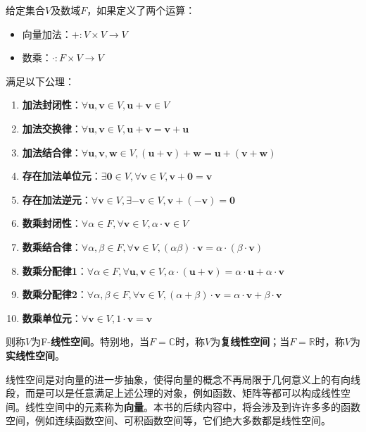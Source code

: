 \documentclass{ctexbook}
\begin{document}
\begin{definition}[线性空间]
    给定集合$V$及数域$F$，如果定义了两个运算：
    \begin{itemize}
        \item 向量加法：$+:V\times V\rightarrow V$
        \item 数乘：$\cdot :F\times V\rightarrow V$
    \end{itemize}
    满足以下公理：
    \begin{enumerate}
        \item \textbf{加法封闭性}：$\forall \mathbf{u},\mathbf{v}\in V,\mathbf{u}+\mathbf{v}\in V$
        \item \textbf{加法交换律}：$\forall \mathbf{u},\mathbf{v}\in V,\mathbf{u}+\mathbf{v}=\mathbf{v}+\mathbf{u}$
        \item \textbf{加法结合律}：$\forall \mathbf{u},\mathbf{v},\mathbf{w}\in V,(\mathbf{u}+\mathbf{v})+\mathbf{w}=\mathbf{u}+(\mathbf{v}+\mathbf{w})$
        \item \textbf{存在加法单位元}：$\exists \mathbf{0}\in V,\forall \mathbf{v}\in V,\mathbf{v}+\mathbf{0}=\mathbf{v}$
        \item \textbf{存在加法逆元}：$\forall \mathbf{v}\in V,\exists -\mathbf{v}\in V,\mathbf{v}+(-\mathbf{v})=\mathbf{0}$
        \item \textbf{数乘封闭性}：$\forall \alpha\in F,\forall \mathbf{v}\in V,\alpha\cdot\mathbf{v}\in V$
        \item \textbf{数乘结合律}：$\forall \alpha,\beta\in F,\forall \mathbf{v}\in V,(\alpha\beta)\cdot\mathbf{v}=\alpha\cdot(\beta\cdot\mathbf{v})$
        \item \textbf{数乘分配律1}：$\forall \alpha\in F,\forall \mathbf{u},\mathbf{v}\in V,\alpha\cdot(\mathbf{u}+\mathbf{v})=\alpha\cdot\mathbf{u}+\alpha\cdot\mathbf{v}$
        \item \textbf{数乘分配律2}：$\forall \alpha,\beta\in F,\forall \mathbf{v}\in V,(\alpha+\beta)\cdot\mathbf{v}=\alpha\cdot\mathbf{v}+\beta\cdot\mathbf{v}$
        \item \textbf{数乘单位元}：$\forall \mathbf{v}\in V,1\cdot\mathbf{v}=\mathbf{v}$
    \end{enumerate}
    则称$V$为F-\textbf{线性空间}。特别地，当$F=\mathbb{C}$时，称$V$为\textbf{复线性空间}；当$F=\mathbb{R}$时，称$V$为\textbf{实线性空间}。
\end{definition}

线性空间是对向量的进一步抽象，使得向量的概念不再局限于几何意义上的有向线段，而是可以是任意满足上述公理的对象，例如函数、矩阵等都可以构成线性空间。线性空间中的元素称为\textbf{向量}。本书的后续内容中，将会涉及到许许多多的函数空间，例如连续函数空间、可积函数空间等，它们绝大多数都是线性空间。
\end{document}
